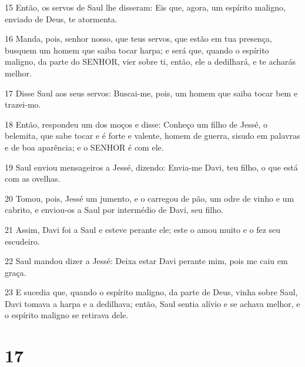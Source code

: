 \par 15 Então, os servos de Saul lhe disseram: Eis que, agora, um espírito maligno, enviado de Deus, te atormenta.
\par 16 Manda, pois, senhor nosso, que teus servos, que estão em tua presença, busquem um homem que saiba tocar harpa; e será que, quando o espírito maligno, da parte do SENHOR, vier sobre ti, então, ele a dedilhará, e te acharás melhor.
\par 17 Disse Saul aos seus servos: Buscai-me, pois, um homem que saiba tocar bem e trazei-mo.
\par 18 Então, respondeu um dos moços e disse: Conheço um filho de Jessé, o belemita, que sabe tocar e é forte e valente, homem de guerra, sisudo em palavras e de boa aparência; e o SENHOR é com ele.
\par 19 Saul enviou mensageiros a Jessé, dizendo: Envia-me Davi, teu filho, o que está com as ovelhas.
\par 20 Tomou, pois, Jessé um jumento, e o carregou de pão, um odre de vinho e um cabrito, e enviou-os a Saul por intermédio de Davi, seu filho.
\par 21 Assim, Davi foi a Saul e esteve perante ele; este o amou muito e o fez seu escudeiro.
\par 22 Saul mandou dizer a Jessé: Deixa estar Davi perante mim, pois me caiu em graça.
\par 23 E sucedia que, quando o espírito maligno, da parte de Deus, vinha sobre Saul, Davi tomava a harpa e a dedilhava; então, Saul sentia alívio e se achava melhor, e o espírito maligno se retirava dele.

\chapter{17}

